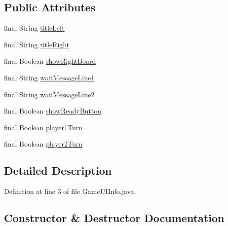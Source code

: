 \subsection*{Public Attributes}
\begin{DoxyCompactItemize}
\item 
final String \hyperlink{classpt_1_1up_1_1fe_1_1lpro1613_1_1sharedlib_1_1structs_1_1_game_u_i_info_a798fd7d7503ee81e37866d82d02705ee}{title\+Left}
\item 
final String \hyperlink{classpt_1_1up_1_1fe_1_1lpro1613_1_1sharedlib_1_1structs_1_1_game_u_i_info_a335b692f6aa35df7e3489f5e20b2cade}{title\+Right}
\item 
final Boolean \hyperlink{classpt_1_1up_1_1fe_1_1lpro1613_1_1sharedlib_1_1structs_1_1_game_u_i_info_a20d8a3eadd649476b4a7aa3f9b7d7f57}{show\+Right\+Board}
\item 
final String \hyperlink{classpt_1_1up_1_1fe_1_1lpro1613_1_1sharedlib_1_1structs_1_1_game_u_i_info_aeae3b5efead23d6a6aa373738460fba2}{wait\+Message\+Line1}
\item 
final String \hyperlink{classpt_1_1up_1_1fe_1_1lpro1613_1_1sharedlib_1_1structs_1_1_game_u_i_info_a15c062eb1e6fd3a80cfa706f2e786522}{wait\+Message\+Line2}
\item 
final Boolean \hyperlink{classpt_1_1up_1_1fe_1_1lpro1613_1_1sharedlib_1_1structs_1_1_game_u_i_info_a576914a206905929c654271f00c936b8}{show\+Ready\+Button}
\item 
final Boolean \hyperlink{classpt_1_1up_1_1fe_1_1lpro1613_1_1sharedlib_1_1structs_1_1_game_u_i_info_a157213d6fe17796f0dccb85bf2aba49d}{player1\+Turn}
\item 
final Boolean \hyperlink{classpt_1_1up_1_1fe_1_1lpro1613_1_1sharedlib_1_1structs_1_1_game_u_i_info_ad206089fbb83e13c0943a8c515638b7e}{player2\+Turn}
\end{DoxyCompactItemize}


\subsection{Detailed Description}


Definition at line 3 of file Game\+U\+I\+Info.\+java.



\subsection{Constructor \& Destructor Documentation}
\hypertarget{classpt_1_1up_1_1fe_1_1lpro1613_1_1sharedlib_1_1structs_1_1_game_u_i_info_a150aca8387fa441d0c3983ae718e79ef}{}\label{classpt_1_1up_1_1fe_1_1lpro1613_1_1sharedlib_1_1structs_1_1_game_u_i_info_a150aca8387fa441d0c3983ae718e79ef} 
